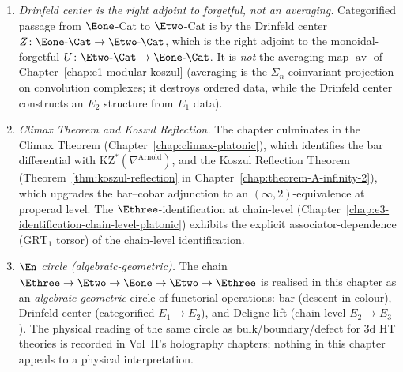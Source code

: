\begin{remark}
\begin{enumerate}[label=\textup{(\Alph*)}]
 $\Etwo^{\mathrm{hol}} \to \Etwo^{\mathrm{top}}$
 (cohomological in general; original-complex chain-level for
 class~$\mathbf{L}$ only under
 Theorem~\ref{thm:chain-level-E3-top-class-L}'s
 higher-brace coherence condition).
 Every reference to $\Ethree^{\mathrm{top}}$ \emph{on the
 original complex} is scope-restricted to the cases where an
 explicit original-complex theorem is invoked or its stated
 coherence package is assumed: class~$\mathbf{L}$
 at non-critical level under $\mathsf{HBC}_L$, class~$\mathbf{G}$
 by commutativity, and
 class~$\mathbf{C}$ through FMS bosonization. Class~$\mathbf{M}$
 is used here only on the completed or coderived surfaces.
\item \emph{Drinfeld center is the right adjoint to
 forgetful, not an averaging.}
 Categorified passage from $\Eone$-Cat to $\Etwo$-Cat is by the
 Drinfeld center $Z\colon \Eone\text{-}\Cat \to \Etwo\text{-}\Cat$,
 which is the right adjoint to the monoidal-forgetful
 $U\colon \Etwo\text{-}\Cat \to \Eone\text{-}\Cat$. It is
 \emph{not} the averaging map $\operatorname{av}$ of
 Chapter~\ref{chap:e1-modular-koszul} (averaging is the
 $\Sigma_n$-coinvariant projection on convolution complexes;
 it destroys ordered data, while the Drinfeld center constructs
 an $E_2$ structure from $E_1$ data).
\item \emph{Climax Theorem and Koszul Reflection.}
 The chapter culminates in the Climax Theorem
 (Chapter~\ref{chap:climax-platonic}), which identifies the bar
 differential with $\mathrm{KZ}^*(\nabla^{\mathrm{Arnold}})$,
 and the Koszul Reflection Theorem
 (Theorem~\ref{thm:koszul-reflection} in
 Chapter~\ref{chap:theorem-A-infinity-2}), which upgrades the
 bar--cobar adjunction to an $(\infty,2)$-equivalence at properad
 level. The $\Ethree$-identification at chain-level
 (Chapter~\ref{chap:e3-identification-chain-level-platonic})
 exhibits the explicit associator-dependence ($\mathrm{GRT}_1$
 torsor) of the chain-level identification.
\item \emph{$\En$ circle (algebraic-geometric).}
 The chain
 $\Ethree \to \Etwo \to \Eone \to \Etwo \to \Ethree$
 is realised in this chapter as an
 \emph{algebraic-geometric} circle of functorial operations:
 bar (descent in colour), Drinfeld center (categorified
 $E_1\to E_2$), and Deligne lift (chain-level $E_2 \to E_3$).
 The physical reading of the same circle as
 bulk/boundary/defect for $3$d HT theories is recorded in
 Vol~II's holography chapters; nothing in this chapter
 appeals to a physical interpretation.
\end{enumerate}
\end{remark}

